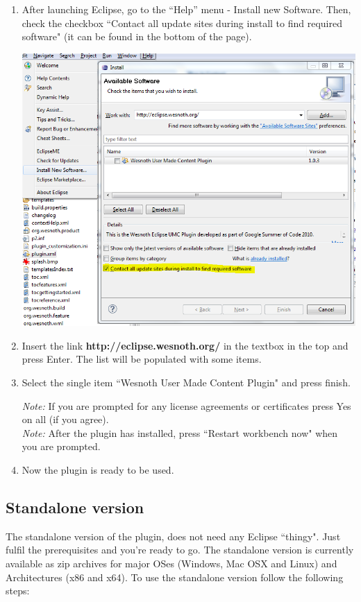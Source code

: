 \documentclass[10pt]{article}
\begin{document}
\begin{enumerate}
\item After launching Eclipse, go to the ``Help'' menu - Install new Software. Then, check the checkbox ``Contact all update sites during install to find required software" (it can be found in the bottom of the page).

\begin{center}
\includegraphics[scale=0.7]{install_new_software.png}
\end{center}

\item Insert the link \textbf{http://eclipse.wesnoth.org/} in the textbox in the top and press Enter. The list will be populated with some items.
\item Select the single item ``Wesnoth User Made Content Plugin" and press finish.

\textit{Note:} If you are prompted for any license agreements or certificates press Yes on all (if you agree).\\
\textit{Note:} After the plugin has installed, press ``Restart workbench now" when you are prompted.
\item Now the plugin is ready to be used.
\end{enumerate}

\subsection{Standalone version}
The standalone version of the plugin, does not need any Eclipse ``thingy". Just fulfil the prerequisites and you're ready to go. The standalone version is currently available as zip archives for major OSes (Windows, Mac OSX and Linux) and Architectures (x86 and x64). To use the standalone version follow the following steps:
\end{document}
